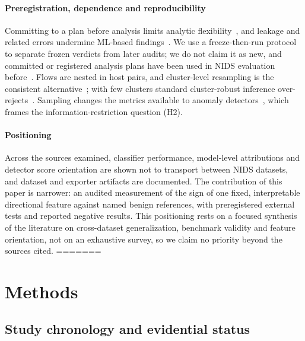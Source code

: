 \documentclass[preprint,12pt]{elsarticle}
\begin{document}
\paragraph{Preregistration, dependence and reproducibility} Committing to a plan before analysis limits analytic flexibility~\cite{nosek2018preregistration}, and leakage and related errors undermine ML-based findings~\cite{kapoor2023leakage}. We use a freeze-then-run protocol to separate frozen verdicts from later audits; we do not claim it as new, and committed or registered analysis plans have been used in NIDS evaluation before~\cite{fernandezbarrios2026candidate,zmaimita2026prereg}. Flows are nested in host pairs, and cluster-level resampling is the consistent alternative~\cite{fieldwelsh2007}; with few clusters standard cluster-robust inference over-rejects~\cite{cameron2008bootstrap}. Sampling changes the metrics available to anomaly detectors~\cite{brauckhoff2006sampling}, which frames the information-restriction question (H2).

\paragraph{Positioning} Across the sources examined, classifier performance, model-level attributions and detector score orientation are shown not to transport between NIDS datasets, and dataset and exporter artifacts are documented. The contribution of this paper is narrower: an audited measurement of the sign of one fixed, interpretable directional feature against named benign references, with preregistered external tests and reported negative results. This positioning rests on a focused synthesis of the literature on cross-dataset generalization, benchmark validity and feature orientation, not on an exhaustive survey, so we claim no priority beyond the sources cited.
=======


\section{Methods}\label{sec:methods}

\subsection{Study chronology and evidential status}\label{sec:chronology}
\end{document}
